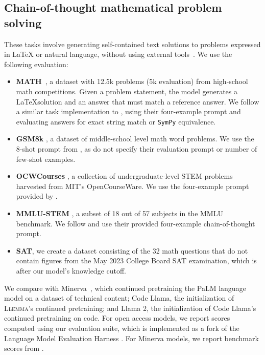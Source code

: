 \subsection{Chain-of-thought mathematical problem solving}
\label{sec:cot_results}

These tasks involve generating self-contained text solutions to problems expressed in \LaTeX{} or natural language, without using external tools~\citep{lewkowycz2022solving}. We use the following evaluation:

\begin{itemize}[leftmargin=*]
\item \textbf{MATH}~\citep{hendrycksmath2021}, a dataset with 12.5k problems (5k evaluation) from high-school math competitions. Given a problem statement, the model generates a \LaTeX solution and an answer that must match a reference answer. We follow a similar task implementation to \cite{lewkowycz2022solving}, using their four-example prompt and evaluating answers for exact string match or \texttt{SymPy} equivalence. 

\item \textbf{GSM8k} \citep{cobbe2021gsm8k}, a dataset of middle-school level math word problems. We use the 8-shot prompt from \citet{wei2023chainofthought}, as \citet{lewkowycz2022solving} do not specify their evaluation prompt or number of few-shot examples.
\item \textbf{OCWCourses} \citep{lewkowycz2022solving}, a collection of undergraduate-level STEM problems harvested from MIT's OpenCourseWare. We use the four-example prompt provided by \citep{lewkowycz2022solving}.
\item \textbf{MMLU-STEM} \citep{hendrycks2021measuring}, a subset of 18 out of 57 subjects in the MMLU benchmark. We follow \citet{lewkowycz2022solving} and use their provided four-example chain-of-thought prompt. 
\item \textbf{SAT}, we create a dataset consisting of the 32 math questions that do not contain figures from the May 2023 College Board SAT examination, which is after our model's knowledge cutoff. 
\end{itemize}

We compare with Minerva~\citep{lewkowycz2022solving}, which continued pretraining the PaLM language model on a dataset of technical content; Code Llama, the initialization of \textsc{Llemma}'s continued pretraining; and Llama 2, the initialization of Code Llama's continued pretraining on code. For open access models, we report scores computed using our evaluation suite, which is implemented as a fork of the Language Model Evaluation Harness \citep{eval-harness}. For Minerva models, we report benchmark scores from \cite{lewkowycz2022solving}.

